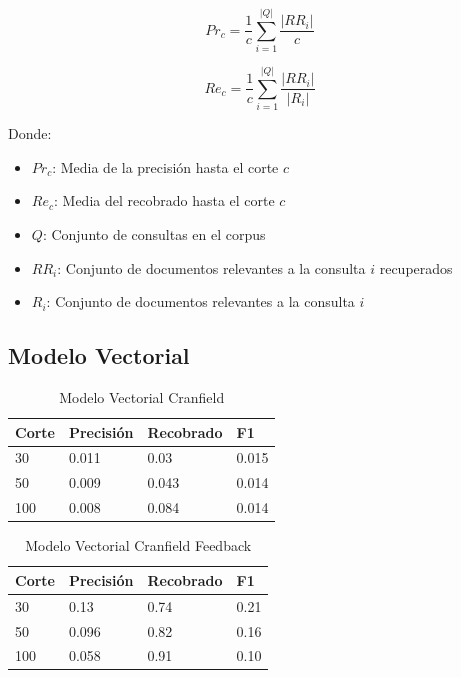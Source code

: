 \documentclass[runningheads]{llncs}
\begin{document}
\begin{equation}
Pr_c = \frac{1}{c} \sum_{i=1}^{|Q|} \frac{|RR_i|}{c}
\end{equation}

\begin{equation}
Re_c = \frac{1}{c} \sum_{i=1}^{|Q|} \frac{|RR_i|}{|R_i|}
\end{equation}

Donde:

\begin{itemize}

	\item $Pr_c$: Media de la precisión hasta el corte $c$
	\item $Re_c$: Media del recobrado hasta el corte $c$
	\item $Q$: Conjunto de consultas en el corpus
	\item $RR_i$: Conjunto de documentos relevantes a la consulta $i$ recuperados
	\item $R_i$: Conjunto de documentos relevantes a la consulta $i$

\end{itemize}

\newpage

\subsection{Modelo Vectorial}

\begin{table}
	\caption{Modelo Vectorial Cranfield}\label{cran_vec_result}
 \begin{tabular}{|l|l|l|l|}
 \hline
 	Corte &  Precisión & Recobrado & F1\\
 \hline
	30 & 0.011 & 0.03 & 0.015\\
	50 & 0.009 & 0.043 & 0.014\\
	100 & 0.008 & 0.084 & 0.014\\
 \hline
 \end{tabular}
\end{table}


\begin{table}
	\caption{Modelo Vectorial Cranfield Feedback}\label{cran_vec_feed_result}
 \begin{tabular}{|l|l|l|l|}
 \hline
 	Corte &  Precisión & Recobrado & F1\\
 \hline
	30 & 0.13 & 0.74 & 0.21\\
	50 & 0.096 & 0.82 & 0.16\\
	100 & 0.058 & 0.91 & 0.10\\
 \hline
 \end{tabular}
\end{table}
\end{document}
